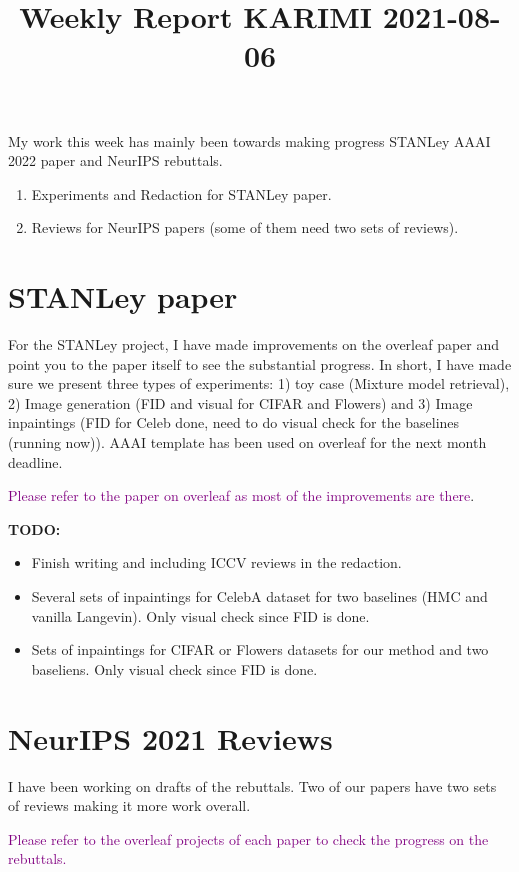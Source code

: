 \documentclass{article}
\begin{document}
\title{Weekly Report KARIMI 2021-08-06}


\date{}
\maketitle

\vspace{-0.5in}

My work this week has mainly been towards making progress STANLey AAAI 2022 paper and NeurIPS rebuttals.
\begin{enumerate}
\item Experiments and Redaction for STANLey paper.
\item Reviews for NeurIPS papers (some of them need two sets of reviews).
\end{enumerate}



\section{STANLey paper}

For the STANLey project, I have made improvements on the overleaf paper and point you to the paper itself to see the substantial progress.
In short, I have made sure we present three types of experiments: 1) toy case (Mixture model retrieval), 2) Image generation (FID and visual for CIFAR and Flowers) and 3) Image inpaintings (FID for Celeb done, need to do visual check for the baselines (running now)).
AAAI template has been used on overleaf for the next month deadline.

\textcolor{purple}{Please refer to the paper on overleaf as most of the improvements are there}.

\textbf{TODO:}

\begin{itemize}
\item Finish writing and including ICCV reviews in the redaction.
\item Several sets of inpaintings for CelebA dataset for two baselines (HMC and vanilla Langevin). Only visual check since FID is done.
\item Sets of inpaintings for CIFAR or Flowers datasets for our method and two baseliens. Only visual check since FID is done.
\end{itemize}



\section{NeurIPS 2021 Reviews}

I have been working on drafts of the rebuttals.
Two of our papers have two sets of reviews making it more work overall.


\textcolor{purple}{Please refer to the overleaf projects of each paper to check the progress on the rebuttals.}




\end{document}
